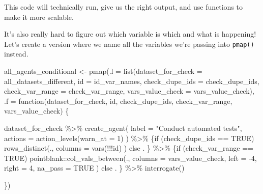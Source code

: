 \documentclass[
  letterpaper,
  DIV=11,
  numbers=noendperiod]{scrreprt}
\newenvironment{Shaded}{\begin{snugshade}}{\end{snugshade}}
\newcommand{\AttributeTok}[1]{\textcolor[rgb]{0.40,0.45,0.13}{#1}}
\newcommand{\ConstantTok}[1]{\textcolor[rgb]{0.56,0.35,0.01}{#1}}
\newcommand{\ControlFlowTok}[1]{\textcolor[rgb]{0.00,0.23,0.31}{#1}}
\newcommand{\DecValTok}[1]{\textcolor[rgb]{0.68,0.00,0.00}{#1}}
\newcommand{\FunctionTok}[1]{\textcolor[rgb]{0.28,0.35,0.67}{#1}}
\newcommand{\NormalTok}[1]{\textcolor[rgb]{0.00,0.23,0.31}{#1}}
\newcommand{\OtherTok}[1]{\textcolor[rgb]{0.00,0.23,0.31}{#1}}
\newcommand{\SpecialCharTok}[1]{\textcolor[rgb]{0.37,0.37,0.37}{#1}}
\newcommand{\StringTok}[1]{\textcolor[rgb]{0.13,0.47,0.30}{#1}}
\begin{document}
This code will technically run, give us the right output, and use
functions to make it more scalable.

It's also really hard to figure out which variable is which and what is
happening! Let's create a version where we name all the variables we're
passing into \texttt{pmap()} instead.

\begin{Shaded}
\begin{Highlighting}[]
\NormalTok{all\_agents\_conditional }\OtherTok{\textless{}{-}} \FunctionTok{pmap}\NormalTok{(}\AttributeTok{.l =} \FunctionTok{list}\NormalTok{(}\AttributeTok{dataset\_for\_check =}\NormalTok{ all\_datasets\_different, }
                                         \AttributeTok{id =}\NormalTok{ id\_var\_names, }
                                         \AttributeTok{check\_dupe\_ids =}\NormalTok{ check\_dupe\_ids,}
                                         \AttributeTok{check\_var\_range =}\NormalTok{ check\_var\_range,}
                                         \AttributeTok{vars\_value\_check =}\NormalTok{ vars\_value\_check),}
                               \AttributeTok{.f =} \ControlFlowTok{function}\NormalTok{(dataset\_for\_check,}
\NormalTok{                                             id,}
\NormalTok{                                             check\_dupe\_ids,}
\NormalTok{                                             check\_var\_range,}
\NormalTok{                                             vars\_value\_check) \{}
    
\NormalTok{    dataset\_for\_check }\SpecialCharTok{\%\textgreater{}\%}
      \FunctionTok{create\_agent}\NormalTok{(}
        \AttributeTok{label =} \StringTok{"Conduct automated tests"}\NormalTok{,}
        \AttributeTok{actions =} \FunctionTok{action\_levels}\NormalTok{(}\AttributeTok{warn\_at =} \DecValTok{1}\NormalTok{)}
\NormalTok{      ) }\SpecialCharTok{\%\textgreater{}\%}
\NormalTok{      \{}\ControlFlowTok{if}\NormalTok{ (check\_dupe\_ids }\SpecialCharTok{==} \ConstantTok{TRUE}\NormalTok{)}
        \FunctionTok{rows\_distinct}\NormalTok{(.,}
          \AttributeTok{columns =} \FunctionTok{vars}\NormalTok{(}\SpecialCharTok{!!!}\NormalTok{id)}
\NormalTok{          )}
        \ControlFlowTok{else}\NormalTok{ .}
\NormalTok{        \} }\SpecialCharTok{\%\textgreater{}\%}
\NormalTok{      \{}\ControlFlowTok{if}\NormalTok{ (check\_var\_range }\SpecialCharTok{==} \ConstantTok{TRUE}\NormalTok{)}
\NormalTok{        pointblank}\SpecialCharTok{::}\FunctionTok{col\_vals\_between}\NormalTok{(.,}
          \AttributeTok{columns =}\NormalTok{ vars\_value\_check,}
          \AttributeTok{left =} \SpecialCharTok{{-}}\DecValTok{4}\NormalTok{,}
          \AttributeTok{right =} \DecValTok{4}\NormalTok{,}
          \AttributeTok{na\_pass =} \ConstantTok{TRUE}
\NormalTok{        )}
        \ControlFlowTok{else}\NormalTok{ .}
\NormalTok{        \} }\SpecialCharTok{\%\textgreater{}\%} 
      \FunctionTok{interrogate}\NormalTok{()}

  
\NormalTok{\})}
\end{Highlighting}
\end{Shaded}
\end{document}

